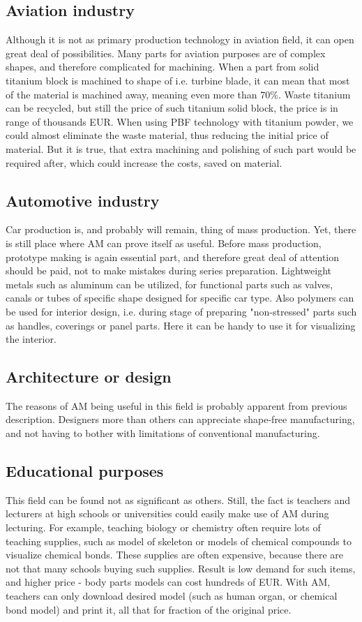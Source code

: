 \documentclass[a4paper]{report}
\begin{document}
\subsection{Aviation industry}
Although it is not as primary production technology in aviation field, it can open great deal of possibilities. Many parts for aviation purposes are of complex shapes, and therefore complicated for machining. When a part from solid titanium block is machined to shape of i.e. turbine blade, it can mean that most of the material is machined away, meaning even more than 70\%. Waste titanium can be recycled, but still the price of such titanium solid block, the price is in range of thousands EUR. When using PBF technology with titanium powder, we could almost eliminate the waste material, thus reducing the initial price of material. But it is true, that extra machining and polishing of such part would be required after, which could increase the costs, saved on material.
\subsection{Automotive industry}
Car production is, and probably will remain, thing of mass production. Yet, there is still place where AM can prove itself as useful. Before mass production, prototype making is again essential part, and therefore great deal of attention should be paid, not to make mistakes during series preparation. Lightweight metals such as aluminum can be utilized, for functional parts such as valves, canals or tubes of specific shape designed for specific car type. Also polymers can be used for interior design, i.e. during stage of preparing "non-stressed" parts such as handles, coverings or panel parts. Here it can be handy to use it for visualizing the interior.
\subsection{Architecture or design}
The reasons of AM being useful in this field is probably apparent from previous description. Designers more than others can appreciate shape-free manufacturing, and not having to bother with limitations of conventional manufacturing. 
\subsection{Educational purposes}
This field can be found not as significant as others. Still, the fact is teachers and lecturers at high schools or universities could easily make use of AM during lecturing. For example, teaching biology or chemistry often require lots of teaching supplies, such as model of skeleton or models of chemical compounds to visualize chemical bonds. These supplies are often expensive, because there are not that many schools buying such supplies. Result is low demand for such items, and higher price - body parts models can cost hundreds of EUR. With AM, teachers can only download desired model (such as human organ, or chemical bond model) and print it, all that for fraction of the original price.
%
%
%
\end{document}
